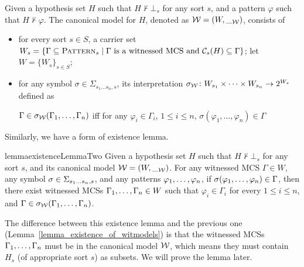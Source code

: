 \documentclass{amsart}
\begin{document}
\begin{definition}
\label{def_canonical_model_B}
Given a hypothesis set $H$ 
such that $H \not\vdash \bot_s$ for any sort $s$,
and a pattern $\varphi$ such that
$H \not\vdash \varphi$.
The canonical model for $H$, denoted as
$\mathcal{W} = (W,\__{\mathcal{W}})$,
consists of
\begin{itemize}
\item for every sort $s \in S$,
a carrier set
$W_s = \{ \Gamma \subseteq \textnormal{\textsc{Pattern}}_s
       \mid \text{$\Gamma$ is a witnessed MCS and
       	          $\mathcal{C}_s(H) \subseteq \Gamma$}\}$;
      let $W = \{W_s\}_{s \in S}$;
\item for any symbol 
$\sigma \in \Sigma_{s_1 \dots s_n , s}$,
its interpretation 
$\sigma_{\mathcal{W}} \colon W_{s_1} \times \dots \times W_{s_n} \to 2^{W_s}$
defined as
\begin{center}
	$\Gamma \in \sigma_{\mathcal{W}}(\Gamma_1,\dots,\Gamma_n)$
	\quad iff \quad
	for any $\varphi_i \in \Gamma_i$, $1 \le i \le n$,
	$\sigma(\varphi_1,\dots,\varphi_n) \in \Gamma$
\end{center}
\end{itemize}
\end{definition}

Similarly, we have a form of existence lemma.
\begin{restatable}{lemma}{existenceLemmaTwo}
\label{lemma_existence_lamma_two}
Given a hypothesis set $H$ 
such that $H \not\vdash \bot_s$ for any sort $s$,
and its canonical model
$\mathcal{W} = (W,\__{\mathcal{W}})$.
For any witnessed MCS $\Gamma \in W$,
any symbol $\sigma \in \Sigma_{s_1 \dots s_n , s}$,
and any patterns $\varphi_1 ,\dots, \varphi_n$,
if $\sigma(\varphi_1 ,\dots, \varphi_n) \in \Gamma$,
then there exist witnessed MCSs $\Gamma_1 ,\dots, \Gamma_n \in W$ such that
$\varphi_i \in \Gamma_i$ for every $1 \le i \le n$, and
$\Gamma \in {\sigma_{\mathcal{W}}}( \Gamma_1 ,\dots, \Gamma_n )$.
\end{restatable}
The difference between this existence lemma and
the previous one (Lemma~\ref{lemma_existence_of_witmodels})
is that the witnessed MCSs $\Gamma_1 ,\dots, \Gamma_n$ 
must be in the canonical model $\mathcal{W}$,
which means they must contain $H_s$ (of appropriate sort $s$)
as subsets.
We will prove the lemma later.
\end{document}
